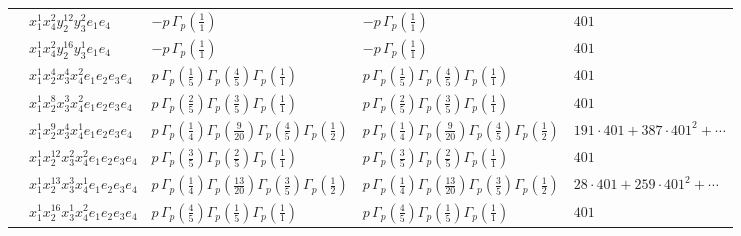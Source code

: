 \documentclass[11pt]{article}
\begin{document}
\begin{table}[ht]
{\begin{tabular}{@{}lllll@{}}
 & $x_{1}^{1} x_{4}^{2} y_{2}^{12} y_{3}^{2} e_{1} e_{4}$ & $- p \, \Gamma_p \left( \frac{1}{1} \right)$ & $- p \, \Gamma_p \left( \frac{1}{1} \right)$ & $401$ \\
 & $x_{1}^{1} x_{4}^{2} y_{2}^{16} y_{3}^{1} e_{1} e_{4}$ & $- p \, \Gamma_p \left( \frac{1}{1} \right)$ & $- p \, \Gamma_p \left( \frac{1}{1} \right)$ & $401$ \\
 & $x_{1}^{1} x_{2}^{4} x_{3}^{4} x_{4}^{2}  e_{1} e_{2} e_{3} e_{4}$ & $p \, \Gamma_p \left( \frac{1}{5} \right) \Gamma_p \left( \frac{4}{5} \right) \Gamma_p \left( \frac{1}{1} \right)$ & $p \, \Gamma_p \left( \frac{1}{5} \right) \Gamma_p \left( \frac{4}{5} \right) \Gamma_p \left( \frac{1}{1} \right)$ & $401$ \\
 & $x_{1}^{1} x_{2}^{8} x_{3}^{3} x_{4}^{2}  e_{1} e_{2} e_{3} e_{4}$ & $p \, \Gamma_p \left( \frac{2}{5} \right) \Gamma_p \left( \frac{3}{5} \right) \Gamma_p \left( \frac{1}{1} \right)$ & $p \, \Gamma_p \left( \frac{2}{5} \right) \Gamma_p \left( \frac{3}{5} \right) \Gamma_p \left( \frac{1}{1} \right)$ & $401$ \\
 & $x_{1}^{1} x_{2}^{9} x_{3}^{4} x_{4}^{1}  e_{1} e_{2} e_{3} e_{4}$ & $p \, \Gamma_p \left( \frac{1}{4} \right) \Gamma_p \left( \frac{9}{20} \right) \Gamma_p \left( \frac{4}{5} \right) \Gamma_p \left( \frac{1}{2} \right)$ & $p \, \Gamma_p \left( \frac{1}{4} \right) \Gamma_p \left( \frac{9}{20} \right) \Gamma_p \left( \frac{4}{5} \right) \Gamma_p \left( \frac{1}{2} \right)$ & $191{\cdot}401{+}387{\cdot}401^{2}{+}\cdots$ \\
 & $x_{1}^{1} x_{2}^{12} x_{3}^{2} x_{4}^{2}  e_{1} e_{2} e_{3} e_{4}$ & $p \, \Gamma_p \left( \frac{3}{5} \right) \Gamma_p \left( \frac{2}{5} \right) \Gamma_p \left( \frac{1}{1} \right)$ & $p \, \Gamma_p \left( \frac{3}{5} \right) \Gamma_p \left( \frac{2}{5} \right) \Gamma_p \left( \frac{1}{1} \right)$ & $401$ \\
 & $x_{1}^{1} x_{2}^{13} x_{3}^{3} x_{4}^{1}  e_{1} e_{2} e_{3} e_{4}$ & $p \, \Gamma_p \left( \frac{1}{4} \right) \Gamma_p \left( \frac{13}{20} \right) \Gamma_p \left( \frac{3}{5} \right) \Gamma_p \left( \frac{1}{2} \right)$ & $p \, \Gamma_p \left( \frac{1}{4} \right) \Gamma_p \left( \frac{13}{20} \right) \Gamma_p \left( \frac{3}{5} \right) \Gamma_p \left( \frac{1}{2} \right)$ & $28{\cdot}401{+}259{\cdot}401^{2}{+}\cdots$ \\
 & $x_{1}^{1} x_{2}^{16} x_{3}^{1} x_{4}^{2}  e_{1} e_{2} e_{3} e_{4}$ & $p \, \Gamma_p \left( \frac{4}{5} \right) \Gamma_p \left( \frac{1}{5} \right) \Gamma_p \left( \frac{1}{1} \right)$ & $p \, \Gamma_p \left( \frac{4}{5} \right) \Gamma_p \left( \frac{1}{5} \right) \Gamma_p \left( \frac{1}{1} \right)$ & $401$ \\

\end{tabular}}
\end{table}
\end{document}
